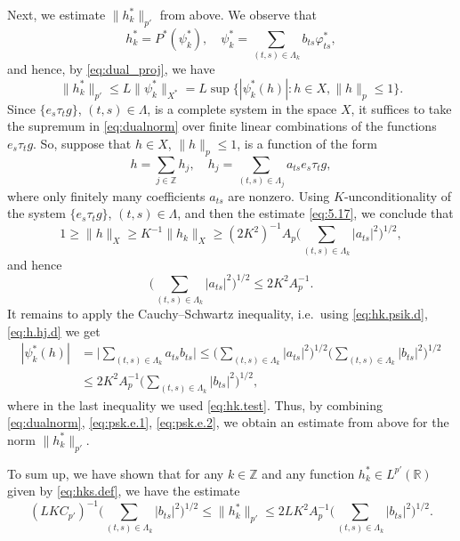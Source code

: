 \documentclass[reqno,a4paper,12pt]{amsart}
\numberwithin{equation}{section}
\numberwithin{figure}{section}
\newcommand\R{\mathbb{R}}
\newcommand\Z{\mathbb{Z}}
\newcommand\1{\mathds{1}}
\newcommand{\pphi}{\varphi}
\renewcommand\le{\leqslant}
\renewcommand\ge{\geqslant}
\theoremstyle{plain}
\theoremstyle{definition}
\begin{document}
Next, we estimate $\|h_k^*\|_{p'}$ from above. 
We observe that 
\begin{equation}
\label{eq:hk.psik.d}
h_k^* = P^*(	\psi_{k}^*), \quad \psi_{k}^* = \sum_{(t,s)\in\Lambda_k} b_{ts} \pphi^*_{ts},
\end{equation}
and hence, by \eqref{eq:dual_proj}, we have 
\begin{equation}
\label{eq:dualnorm}
\|h_k^*\|_{p'}\le L \|\psi_k^*\|_{X^*} = L  \sup \{ |\psi_k^*(h)| : 
h \in X, \|h\|_{p} \le 1\}.
\end{equation}
Since $ \{e_s\tau_t g\}$, $(t,s)\in\Lambda$, is a complete system
in the space $X$, it suffices to take the supremum in \eqref{eq:dualnorm} over finite linear combinations of the functions $e_s\tau_t g$. So, suppose that $h \in X$, $\| h \|_p \le 1$, is a function of the form
\begin{equation}
\label{eq:h.hj.d}
h = \sum_{j \in \Z} h_j, \quad h_j =  \sum_{(t,s)\in\Lambda_j } a_{ts} e_s\tau_t g,
\end{equation}
where only finitely many coefficients $a_{ts}$ are nonzero.
Using $K$-unconditionality of the system 
$\{e_s\tau_t g\}$, $(t,s)\in\Lambda$,
 and then the estimate \eqref{eq:5.17}, we conclude that
\begin{equation}
1 \ge \|h\|_X \ge K^{-1} \|h_k\|_{X}
\ge (2K^2)^{-1} A_p  \Big( \sum_{(t,s)\in\Lambda_k} |a_{ts}|^2 \Big)^{1/2},
\end{equation}
and hence
\begin{equation}
\label{eq:hk.test}
\Big(\sum_{(t,s)\in\Lambda_k} |a_{ts}|^2 \Big)^{1/2} \le  2K^2 A_p^{-1}.
\end{equation}
It remains to apply the Cauchy--Schwartz inequality, i.e.\ using
\eqref{eq:hk.psik.d}, \eqref{eq:h.hj.d} we get
\begin{align}
|\psi_k^*(h)|  &= \Big| \sum_{(t,s)\in\Lambda_k} a_{ts} b_{ts} \Big| 
\le \Big( \sum_{(t,s)\in\Lambda_k} |a_{ts}|^2 \Big)^{1/2} 
\Big( \sum_{(t,s)\in\Lambda_k} |b_{ts}|^2 \Big)^{1/2} \label{eq:psk.e.1} \\
& \le  2K^2 A_p^{-1} \Big( \sum_{(t,s)\in\Lambda_k} |b_{ts}|^2 \Big)^{1/2},  \label{eq:psk.e.2}
\end{align}
where in the last inequality we used \eqref{eq:hk.test}. Thus, 
by combining \eqref{eq:dualnorm}, \eqref{eq:psk.e.1}, \eqref{eq:psk.e.2},
we obtain an estimate from above for the norm $\|h_k^*\|_{p'}$.

To sum up, we have shown that
for any $k\in\Z$ and any function $h^*_k \in L^{p'}(\R)$ given by 
\eqref{eq:hks.def}, we have the estimate
\begin{equation}
\label{eq:keyest_dual}
(L K C_{p'})^{-1}  \Big( \sum_{(t,s)\in\Lambda_k}|b_{ts}|^2 \Big)^{1/2}
\le \|h_k^*\|_{p'}
\le  2 L K^2  A_p^{-1} \Big( \sum_{(t,s)\in\Lambda_k} |b_{ts}|^2 \Big)^{1/2}.
\end{equation}
\end{document}
